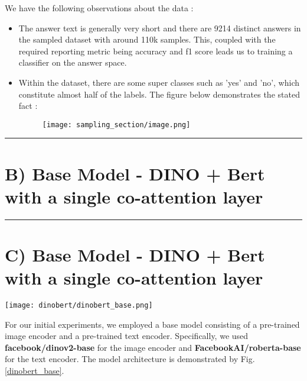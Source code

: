 \documentclass[conference]{IEEEtran}
\begin{document}
We have the following observations about the data : 
\begin{itemize}
    \item The answer text is generally very short and there are 9214 distinct answers in the sampled dataset with around 110k samples. This, coupled with the required reporting metric being accuracy and f1 score leads us to training a classifier on the answer space.
    \item Within the dataset, there are some super classes such as 'yes' and 'no', which constitute almost half of the labels.
    The figure below demonstrates the stated fact : 
    \begin{figure}[H]
        \centering
        \texttt{[image: sampling\_section/image.png]}
    \end{figure}
\end{itemize}


\vspace{0.5cm} \hrule{} \vspace{0.5cm}
\section*{\textbf{B) Base Model - DINO + Bert with a single co-attention layer}}
\label{basemodel}


\vspace{0.5cm} \hrule{} \vspace{0.5cm}
\section*{\textbf{C) Base Model - DINO + Bert with a single co-attention layer}}
\label{basemodel}

\begin{figure*}
    \centering
    \texttt{[image: dinobert/dinobert\_base.png]}
    \caption{Dinobert base model architecture}
    \label{dinobert_base}
\end{figure*}

For our initial experiments, we employed a base model consisting of a pre-trained image encoder and a pre-trained text encoder. Specifically, we used \textbf{facebook/dinov2-base} for the image encoder and \textbf{FacebookAI/roberta-base} for the text encoder. 
The model architecture is demonstrated by Fig. \ref{dinobert_base}.
\end{document}
